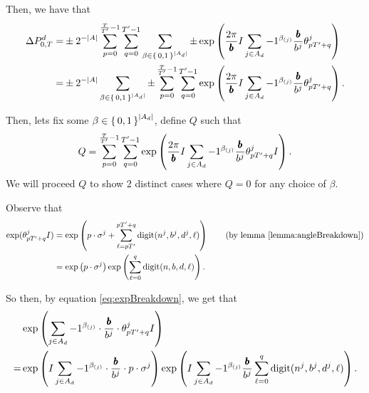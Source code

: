 Then, we have that
\begin{align*}
 \Delta P_{0, T}^d =&
  \pm 2^{-|A|} \sum_{p= 0}^{\frac{T}{{T}'} - 1} \sum_{q = 0}^{{T}' - 1}
 \sum_{\beta \in \set{0,1}^{|A_d|}} 
 	 \pm
    \exp\left(
      	\frac{2\pi}{{\pmb{b}}} I
        \sum_{j \in A_d} -1 ^ {\beta_{(j)}}
        \frac{{\pmb{b}}}{b^j} {\theta^j_{p {T}' + q}}
      \right)\\
 =&
  \pm 2^{-|A|} 
 \sum_{\beta \in \set{0,1}^{|A_d|}} 
		\pm
     \sum_{p= 0}^{\frac{T}{{T}'} - 1} \sum_{q = 0}^{{T}' - 1}
    \exp\left(
      	\frac{2\pi}{{\pmb{b}}} I
        \sum_{j \in A_d} -1 ^ {\beta_{(j)}}
        \frac{{\pmb{b}}}{b^j} {\theta^j_{p {T}' + q}}
      \right).
\end{align*}

\newcommand{\eqWTSInnerProd}{
  \sum_{p= 0}^{\frac{\totalPeriod}{\rationalPeriodTotal} - 1} \sum_{q = 0}^{\rationalPeriodTotal - 1}
    \exp\left(
      	\commonToAngle I 
        \sum_{j \in A_d} -1 ^ {\beta_{(j)}}
        \numbToCommon 
        \rationalAngle{p \rationalPeriodTotal + q}I
      \right)}

Then, lets fix some $\beta \in \set{0, 1}^{|A_d|}$, define $Q$ such that
\begin{equation}
\label{eq:wts01}  
  Q = \eqWTSInnerProd.
\end{equation}
We will proceed $Q$ to show 2 distinct cases where $Q = 0$ for any choice of $\beta$.

Observe that 
\begin{align}
  \exp(\rationalAngle{p \rationalPeriodTotal + q}I)
  &= \exp\left(
      p \cdot \digSumPeriodic +
      \sum_{\ell = p \rationalPeriodTotal}^{p \rationalPeriodTotal + q}\mathrm{digit}(n^j, b^j, d^j, \ell)\right)\tag{by lemma \ref{lemma:angleBreakdown}} \\
      \label{eq:expBreakdown}
      &= \exp\left(p \cdot \digSumPeriodic\right) \exp\left(\sum_{\ell = 0}^{q}\mathrm{digit}(n, b, d, \ell)\right).
\end{align}

So then, by equation \eqref{eq:expBreakdown}, we get that
\begin{align}
&\exp\left(
    \sum_{j \in A_d} -1 ^ {\beta_{(j)}}
    \cdot
    \frac{{\pmb{b}}}{b^j} \cdot
    {\theta^j_{p {T}'+ q}}I
\right)\notag \\ 
\label{eq:decomposeExp}
=&
\exp\left(
    I \sum_{j \in A_d} -1 ^ {\beta_{(j)}}
    \cdot
    \frac{{\pmb{b}}}{b^j}
    \cdot p \cdot
    \sigma^j
\right)
\exp\left(
    I \sum_{j \in A_d} -1 ^ {\beta_{(j)}} \frac{{\pmb{b}}}{b^j}
      \sum_{\ell = 0}^{q}\mathrm{digit}(n^j, b^j, d^j, \ell)
\right).
\end{align}

